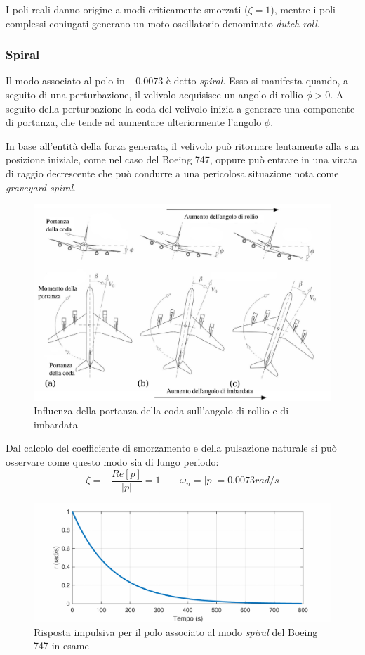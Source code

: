 I poli reali danno origine a modi criticamente smorzati ($\zeta = 1$), mentre i poli complessi coniugati generano un moto oscillatorio denominato \textit{dutch roll}.

\subsubsection{Spiral}

Il modo associato al polo in $-0.0073$ è detto \textit{spiral}. Esso si manifesta quando, a seguito di una perturbazione, il velivolo acquisisce un angolo di rollio $\phi > 0$.
A seguito della perturbazione la coda del velivolo inizia a generare una componente di portanza, che tende ad aumentare ulteriormente l'angolo $\phi$.

In base all'entità della forza generata, il velivolo può ritornare lentamente alla sua posizione iniziale, come nel caso del Boeing 747, oppure può entrare in una virata di raggio decrescente che può condurre a una pericolosa situazione nota come \textit{graveyard spiral}.

\begin{figure}[H]
    \centering
    \includegraphics[width=0.8\linewidth]{Immagini/spiral_mode_physics.jpg}
    \caption{Influenza della portanza della coda sull'angolo di rollio e di imbardata \cite{cook1997flight}}
\end{figure}

Dal calcolo del coefficiente di smorzamento e della pulsazione naturale si può osservare come questo modo sia di lungo periodo:
\begin{equation*}
    \zeta = - \frac{Re[p]}{\left|p\right|} = 1 \qquad \omega_n = \left|p\right| = 0.0073rad/s
\end{equation*}

\begin{figure}[H]
    \centering
    \includegraphics[width=0.7\linewidth]{Immagini/spiral_mode.pdf}
    \caption{Risposta impulsiva per il polo associato al modo \textit{spiral} del Boeing 747 in esame}
\end{figure}

